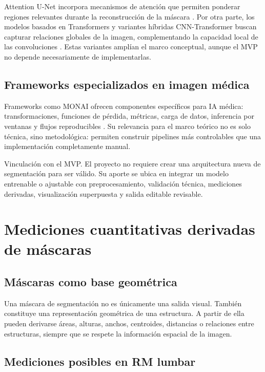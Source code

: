 Attention U-Net incorpora mecanismos de atención que permiten ponderar regiones relevantes durante la reconstrucción de la máscara \parencite{oktay_attention_unet_2018}. Por otra parte, los modelos basados en Transformers y variantes híbridas CNN-Transformer buscan capturar relaciones globales de la imagen, complementando la capacidad local de las convoluciones \parencite{dosovitskiy_vit_2021}. Estas variantes amplían el marco conceptual, aunque el MVP no depende necesariamente de implementarlas.

\subsection{Frameworks especializados en imagen médica}

Frameworks como MONAI ofrecen componentes específicos para IA médica: transformaciones, funciones de pérdida, métricas, carga de datos, inferencia por ventanas y flujos reproducibles \parencite{monai_software}. Su relevancia para el marco teórico no es solo técnica, sino metodológica: permiten construir pipelines más controlables que una implementación completamente manual.

Vinculación con el MVP. El proyecto no requiere crear una arquitectura nueva de segmentación para ser válido. Su aporte se ubica en integrar un modelo entrenable o ajustable con preprocesamiento, validación técnica, mediciones derivadas, visualización superpuesta y salida editable revisable.

\section{Mediciones cuantitativas derivadas de máscaras}

\subsection{Máscaras como base geométrica}

Una máscara de segmentación no es únicamente una salida visual. También constituye una representación geométrica de una estructura. A partir de ella pueden derivarse áreas, alturas, anchos, centroides, distancias o relaciones entre estructuras, siempre que se respete la información espacial de la imagen.

\subsection{Mediciones posibles en RM lumbar}

